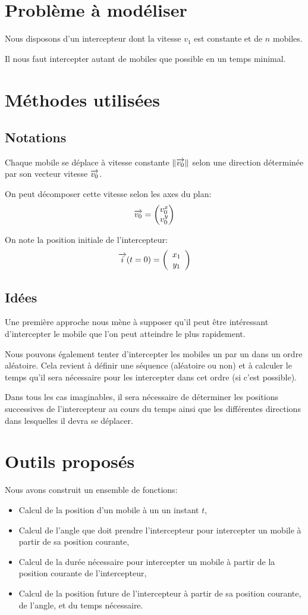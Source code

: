 \section{Problème à modéliser}
Nous disposons d'un intercepteur dont la vitesse $v_1$ est constante et de $n$ mobiles.

Il nous faut intercepter autant de mobiles que possible en un temps minimal.

\section{Méthodes utilisées}

	\subsection{Notations}
		Chaque mobile se déplace à vitesse constante $\left\lVert\overrightarrow{v_0}\right\rVert$ selon une direction déterminée par son vecteur vitesse $\overrightarrow{v_0}$.

		On peut décomposer cette vitesse selon les axes du plan:
		\[ \overrightarrow{v_0} = \begin{pmatrix}v_0^x\\v_0^y\end{pmatrix} \]

		On note la position initiale de l'intercepteur:
		\[
		\overrightarrow{i}(t=0) = 
		\left(
		\begin{array}{c}
		 x_1 \\
		 y_1
		\end{array}
		\right)
		\]

	\subsection{Idées}
	  Une première approche nous mène à supposer qu'il peut être intéressant d'intercepter le mobile que l'on peut atteindre le plus rapidement. 

	  Nous pouvons également tenter d'intercepter les mobiles un par un dans un ordre aléatoire. Cela revient à définir une séquence (aléatoire ou non) et à calculer le temps qu'il sera nécessaire pour les intercepter dans cet ordre (si c'est possible).

	  Dans tous les cas imaginables, il sera nécessaire de déterminer les positions successives de l'intercepteur au cours du temps ainsi que les différentes directions dans lesquelles il devra se déplacer.

\section{Outils proposés}
	Nous avons construit un ensemble de fonctions:
	\begin{itemize}
		\item Calcul de la position d'un mobile à un un instant $t$,
		\item Calcul de l'angle que doit prendre l'intercepteur pour intercepter un mobile à partir de sa position courante,
		\item Calcul de la durée nécessaire pour intercepter un mobile à partir de la position courante de l'intercepteur,
		\item Calcul de la position future de l'intercepteur à partir de sa position courante, de l'angle, et du temps nécessaire.
	\end{itemize}

